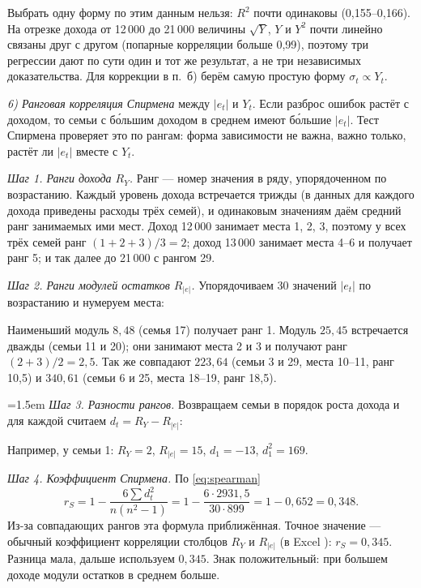 \begin{solution}
Выбрать одну форму по этим данным нельзя: $R^2$ почти одинаковы
(0,155--0,166). На отрезке дохода от 12\,000 до 21\,000 величины $\sqrt{Y}$,
$Y$ и $Y^2$ почти линейно связаны друг с другом (попарные корреляции
больше 0,99), поэтому три регрессии дают по сути один и тот же результат,
а не три независимых доказательства. Для коррекции в п.~б) берём самую
простую форму $\sigma_t \propto Y_t$.

\smallskip
\emph{6) Ранговая корреляция Спирмена} между $|e_t|$ и $Y_t$. Если разброс
ошибок растёт с доходом, то семьи с бо́льшим доходом в среднем имеют бо́льшие
$|e_t|$. Тест Спирмена проверяет это по рангам: форма зависимости не важна,
важно только, растёт ли $|e_t|$ вместе с $Y_t$.

\smallskip
\emph{Шаг 1. Ранги дохода $R_Y$.} Ранг — номер значения в ряду,
упорядоченном по возрастанию. Каждый уровень дохода встречается трижды (в данных для каждого дохода
приведены расходы трёх семей), и
одинаковым значениям даём средний ранг занимаемых ими мест. Доход 12\,000
занимает места 1, 2, 3, поэтому у всех трёх семей ранг $(1+2+3)/3 = 2$;
доход 13\,000 занимает места 4--6 и получает ранг 5; и так далее до
21\,000 с рангом 29.

\smallskip
\emph{Шаг 2. Ранги модулей остатков $R_{|e|}$.} Упорядочиваем 30 значений
$|e_t|$ по возрастанию и нумеруем места:

\spearmanrankvisual
Наименьший модуль $8{,}48$ (семья 17) получает ранг 1. Модуль $25{,}45$
встречается дважды (семьи 11 и 20); они занимают места 2 и 3 и получают
ранг $(2+3)/2 = 2{,}5$. Так же совпадают $223{,}64$ (семьи 3 и 29, места
10--11, ранг 10,5) и $340{,}61$ (семьи 6 и 25, места 18--19, ранг 18,5).

\smallskip
\noindent\begin{minipage}{\linewidth}
\parindent=1.5em
\emph{Шаг 3. Разности рангов.} Возвращаем семьи в порядок роста дохода
и для каждой считаем $d_t = R_Y - R_{|e|}$:

\spearmanvisual
\end{minipage}
Например, у семьи 1: $R_Y = 2$, $R_{|e|} = 15$, $d_1 = -13$, $d_1^2 = 169$.

\smallskip
\emph{Шаг 4. Коэффициент Спирмена.} По \eqref{eq:spearman}
\[
  r_S = 1 - \frac{6\sum d_t^2}{n(n^2-1)} = 1 - \frac{6\cdot 2931{,}5}{30\cdot 899}
      = 1 - 0{,}652 = 0{,}348 .
\]
Из-за совпадающих рангов эта формула приближённая. Точное значение —
обычный коэффициент корреляции столбцов $R_Y$ и $R_{|e|}$ (в Excel
): $r_S = 0{,}345$. Разница мала, дальше используем
$0{,}345$. Знак положительный: при большем доходе модули остатков в среднем
больше.


\end{solution}
